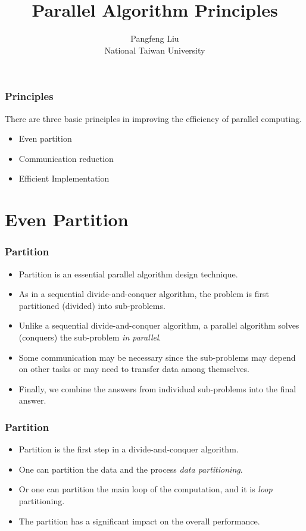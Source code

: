 \documentclass{beamer}
\begin{document}
\begin{CJK}{UTF8}{bsmi}

\title{Parallel Algorithm Principles}

\author{Pangfeng Liu \\ National Taiwan University}

\begin{frame}
\titlepage
\end{frame}

\begin{frame}
\frametitle{Principles} There are three basic principles in improving
the efficiency of parallel computing.
\begin{itemize}
\item Even partition
\item Communication reduction
\item Efficient Implementation
\end{itemize}
\end{frame}

\section{Even Partition}

\begin{frame}
\frametitle{Partition}
\begin{itemize}
\item Partition is an essential parallel algorithm design technique.
\item As in a sequential divide-and-conquer algorithm, the problem is
  first partitioned (divided) into sub-problems.
\item Unlike a sequential divide-and-conquer algorithm, a parallel
  algorithm solves (conquers) the sub-problem {\em in parallel}.
\item Some communication may be necessary since the sub-problems may depend on other tasks or may need to transfer data among
  themselves.
\item Finally, we combine the answers from individual sub-problems into the final answer.
\end{itemize}
\end{frame}

\begin{frame}
\frametitle{Partition}
\begin{itemize}
\item Partition is the first step in a divide-and-conquer algorithm.
\item One can partition the data and the process {\em data partitioning}.
\item Or one can partition the main loop of the computation, and it is {\em loop} partitioning.
\item The partition has a significant impact on the overall performance.
\end{itemize}
\end{frame}


\end{CJK}
\end{document}
